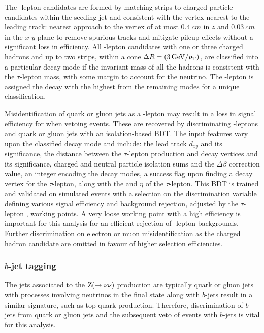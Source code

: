 The \Ptauh-lepton candidates are formed by matching strips to charged particle
candidates within the seeding jet and consistent with the vertex nearest to
the leading track: nearest approach to the vertex of at most $\SI{0.4}{cm}$ in
$z$ and $\SI{0.03}{cm}$ in the $x$-$y$ plane to remove spurious tracks and
mitigate pileup effects without a significant loss in efficiency. All
\Ptauh-lepton candidates with one or three charged hadrons and up to two
strips, within a cone $\Delta R=(\SI{3}{GeV}/p_{\text{T}})$, are classified into a
particular decay mode if the invariant mass of all the hadrons is consistent
with the $\tau$-lepton mass, with some margin to account for the neutrino. The
\Ptauh-lepton is assigned the decay with the highest \pt from the remaining
modes for a unique classification.

Misidentification of quark or gluon jets as a \Ptauh-lepton may result in a
loss in signal efficiency for \IZvvj when vetoing \Ptauh events. These are
recovered by discriminating \Ptauh-leptons and quark or gluon jets with an
isolation-based BDT. The input features vary upon the classified decay mode
and include: the lead track $d_{xy}$ and its significance, the distance
between the $\tau$-lepton production and decay vertices and its significance,
charged and neutral particle isolation sums and the $\Delta\beta$ correction
value, an integer encoding the decay modes, a success flag upon finding a
decay vertex for the $\tau$-lepton, along with the \pt and $\eta$ of the
$\tau$-lepton. This BDT is trained and validated on simulated events with a
selection on the discrimination variable defining various signal efficiency
and background rejection, adjusted by the $\tau$-lepton \pt, working points. A
very loose working point with a high efficiency is important for this analysis
for an efficient rejection of \Ptauh-lepton backgrounds. Further
discrimination on electron or muon misidentification as the charged hadron
candidate are omitted in favour of higher selection efficiencies.

\subsubsection{$b$-jet tagging}

The jets associated to the ${\mathrm{Z}(\rightarrow\nu\bar{\nu})}$ production are typically
quark or gluon jets with processes involving neutrinos in the final state
along with $b$-jets result in a similar signature, such as top-quark
production. Therefore, discrimination of $b$-jets from quark or gluon jets and
the subsequent veto of events with $b$-jets is vital for this analysis.

